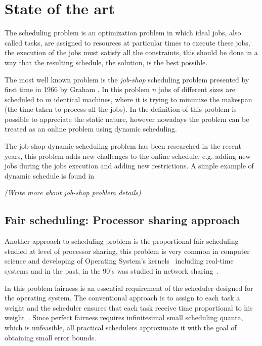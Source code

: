 \documentclass[11pt]{article}
\begin{document}
\newpage
\section{State of the art}
\label{sec:state-of-art}

The scheduling problem is an optimization problem in which ideal jobs, also called tasks, are assigned to resources at particular times to execute these jobs, the execution of the jobs must satisfy all the constraints, this should be done in a way that the resulting schedule, the solution, is the best possible.

The most well known problem is the \textit{job-shop} scheduling problem presented by first time in 1966 by Graham \cite{graham66}. In this problem $n$ jobs of different sizes are scheduled to $m$ identical machines, where it is trying to minimize the makespan (the time taken to process all the jobs). In the definition of this problem is possible to appreciate the static nature, however     nowadays the problem can be treated as an online problem using dynamic scheduling.

The job-shop dynamic scheduling problem has been researched in the recent years, this problem adds new challenges to the online schedule, e.g. adding new jobs during the jobs execution and adding new restrictions. A simple example of dynamic schedule is found in 

\textit{(Write more about job-shop problem details)}

\subsection{Fair scheduling: Processor sharing approach}

Another approach to scheduling problem is the proportional fair scheduling studied at level of processor sharing, this problem is very common in computer science and developing of Operating System's kernels~\cite{li09} including real-time systems and in the past, in the 90's was studied in network sharing~\cite{parekh93}. 

In this problem fairness is an essential requirement of the scheduler designed for the operating system. The conventional approach is to assign to each task a weight and the scheduler ensures that each task receive time proportional to his weight~\cite{parekh93}. Since perfect fairness requires infinitesimal small scheduling quanta, which is unfeasible, all practical schedulers approximate it with the goal of obtaining small error bounds.
\end{document}

